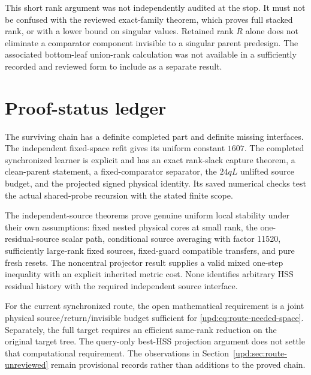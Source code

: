 \documentclass[11pt,oneside,openany,a4paper]{book}
\numberwithin{equation}{chapter}
\theoremstyle{definition}
\theoremstyle{remark}
\begin{document}
This short rank argument was not independently audited at the stop.
It must not be confused with the reviewed exact-family theorem,
which proves full stacked rank, or with a lower bound on singular
values.  Retained rank $R$ alone does not eliminate a comparator
component invisible to a singular parent predesign.  The associated
bottom-leaf union-rank calculation was not available in a sufficiently
recorded and reviewed form to include as a separate result.

\section{Proof-status ledger}

The surviving chain has a definite completed part and definite missing
interfaces.  The independent fixed-space refit gives its uniform
constant $1607$.  The completed synchronized learner is explicit and
has an exact rank-slack capture theorem, a clean-parent statement, a
fixed-comparator separator, the $24qL$ unlifted source budget, and the
projected signed physical identity.  Its saved numerical checks test
the actual shared-probe recursion with the stated finite scope.

The independent-source theorems prove genuine uniform local stability
under their own assumptions: fixed nested physical cores at small
rank, the one-residual-source scalar path, conditional source averaging
with factor 11520, sufficiently large-rank fixed sources, fixed-guard
compatible transfers, and pure fresh resets.  The noncentral projector
result supplies a valid mixed one-step inequality with an explicit
inherited metric cost.  None identifies arbitrary HSS residual history
with the required independent source interface.

For the current synchronized route, the open mathematical requirement
is a joint physical source/return/invisible budget sufficient for
\eqref{upd:eq:route-needed-space}.  Separately, the full target requires an
efficient same-rank reduction on the original target tree.  The
query-only best-HSS projection argument does not settle that
computational requirement.  The observations in
Section~\ref{upd:sec:route-unreviewed} remain provisional records rather
than additions to the proved chain.


\appendix
\end{document}
